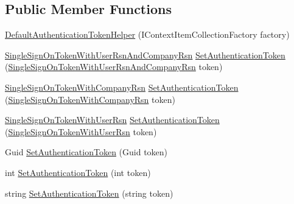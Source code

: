 \subsection*{Public Member Functions}
\begin{DoxyCompactItemize}
\item 
\hyperlink{classCqrs_1_1Authentication_1_1DefaultAuthenticationTokenHelper_a21bfae37d24b180797211396a0348526}{Default\+Authentication\+Token\+Helper} (I\+Context\+Item\+Collection\+Factory factory)
\item 
\hyperlink{classCqrs_1_1Authentication_1_1SingleSignOnTokenWithUserRsnAndCompanyRsn}{Single\+Sign\+On\+Token\+With\+User\+Rsn\+And\+Company\+Rsn} \hyperlink{classCqrs_1_1Authentication_1_1DefaultAuthenticationTokenHelper_ab06712f60b8afc6819b5372e3a21e13a}{Set\+Authentication\+Token} (\hyperlink{classCqrs_1_1Authentication_1_1SingleSignOnTokenWithUserRsnAndCompanyRsn}{Single\+Sign\+On\+Token\+With\+User\+Rsn\+And\+Company\+Rsn} token)
\item 
\hyperlink{classCqrs_1_1Authentication_1_1SingleSignOnTokenWithCompanyRsn}{Single\+Sign\+On\+Token\+With\+Company\+Rsn} \hyperlink{classCqrs_1_1Authentication_1_1DefaultAuthenticationTokenHelper_a2ae21fb09555d3ab5119f9ea4c69b202}{Set\+Authentication\+Token} (\hyperlink{classCqrs_1_1Authentication_1_1SingleSignOnTokenWithCompanyRsn}{Single\+Sign\+On\+Token\+With\+Company\+Rsn} token)
\item 
\hyperlink{classCqrs_1_1Authentication_1_1SingleSignOnTokenWithUserRsn}{Single\+Sign\+On\+Token\+With\+User\+Rsn} \hyperlink{classCqrs_1_1Authentication_1_1DefaultAuthenticationTokenHelper_a57d015883b278136590894a3885d246c}{Set\+Authentication\+Token} (\hyperlink{classCqrs_1_1Authentication_1_1SingleSignOnTokenWithUserRsn}{Single\+Sign\+On\+Token\+With\+User\+Rsn} token)
\item 
Guid \hyperlink{classCqrs_1_1Authentication_1_1DefaultAuthenticationTokenHelper_ad8c9ad34dde1f36073a1cf54bb82ffc5}{Set\+Authentication\+Token} (Guid token)
\item 
int \hyperlink{classCqrs_1_1Authentication_1_1DefaultAuthenticationTokenHelper_af1d9d9cbb1c02ca9a31b3dbd278f9a3e}{Set\+Authentication\+Token} (int token)
\item 
string \hyperlink{classCqrs_1_1Authentication_1_1DefaultAuthenticationTokenHelper_ae37a10289ec6cf99df30e1528feb0394}{Set\+Authentication\+Token} (string token)
\end{DoxyCompactItemize}


